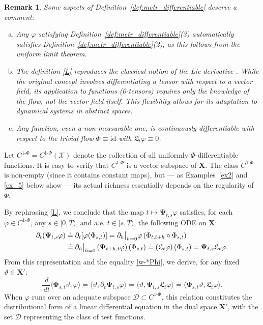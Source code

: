 \documentclass[sn-mathphys-num]{sn-jnl}
\numberwithin{equation}{section}
\theoremstyle{mythm}
\theoremstyle{mydef}
\newtheorem{remark}[proposition]{Remark}
\renewcommand{\phi}{\varphi}
\renewcommand{\d}{\,d}
\newcommand{\id}{\mathrm{id}}
\begin{document}
\begin{remark}Some aspects of Definition~\ref{def:metr_differentiable} deserve a comment:
\begin{enumerate}[(a)]
    \item Any $\phi$ satisfying Definition~\ref{def:metr_differentiable}(3) automatically satisfies Definition~\ref{def:metr_differentiable}(2), as this follows from the uniform limit theorem.

    \item The definition \eqref{L} reproduces the classical notion of the Lie derivative \cite{Lee2013}. While the original concept involves differentiating a tensor with respect to a vector field, its application to functions (0-tensors) requires only the knowledge of the flow, not the vector field itself. This flexibility allows for its adaptation to dynamical systems in abstract spaces.

    \item Any function, even a non-measurable one, is continuously differentiable with respect to the trivial flow $\Phi \equiv \id$ with $\mathfrak L_t \phi \equiv 0$.
\end{enumerate}
\end{remark}

Let $C^{1\text{-}\Phi} = C^{1\text{-}\Phi}(\mathcal{X})$ denote the collection of all uniformly $\Phi$-differentiable functions. It is easy to verify that $C^{1\text{-}\Phi}$ is a vector subspace of $\bm{X}$. The class  $C^{1\text{-}\Phi}$ is non-empty (since it contains constant maps), but --- as Examples~\ref{ex2} and \ref{ex_5} below show --- its actual richness essentially depends on the regularity of $\Phi$.

By rephrasing \eqref{L}, we conclude that the map $t \mapsto \bm{\Psi}_{t,s} \phi$ satisfies, for each $\phi \in C^{1\text{-}\Phi}$, any $s \in [0,T)$, and a.e. $t \in [s, T)$, the following ODE on $\bm{X}$:
\begin{align}
    \partial_t( \bm{\Psi}_{t,s} \phi) &\doteq \partial_t[ \phi(\Phi_{s,t})] = \partial_h \big|_{h=0} \phi\left(\Phi_{t, t+h} \circ \Phi_{s,t}\right) \notag\\
    &\doteq \partial_h \big|_{h=0} \left(\bm{\Psi}_{t+h, t} \phi\right)(\Phi_{s,t}) \doteq \left(\mathfrak{L}_t \phi\right)(\Phi_{s,t}) 
    = \bm{\Psi}_{t,s} \mathfrak{L}_t \phi.\label{psiT}
\end{align}
From this representation and the equality \eqref{w-*Phi}, we derive, for any fixed $\vartheta \in \bm X'$:
\[
    \frac{\d}{\d t}\langle \bm \Phi_{s,t} \vartheta, \phi \rangle = \langle \vartheta, \partial_t \bm{\Psi}_{t,s} \phi \rangle = \langle \vartheta, \bm{\Psi}_{t,s} {\mathfrak{L}_t}{\phi} \rangle \doteq \langle \bm \Phi_{s,t} \vartheta, {\mathfrak{L}_t} \phi \rangle. %
\]
When $\phi$ runs over an adequate subspace $\bm{\mathcal D} \subset C^{1\mbox{-}\Phi}$, this relation constitutes the distributional form of a linear differential equation in the dual space $\bm{X}'$, with the set $\bm{\mathcal D}$ representing the class of test functions. 
\end{document}
